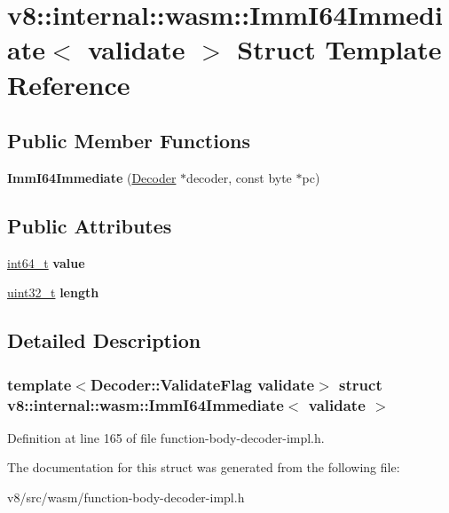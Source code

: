 \hypertarget{structv8_1_1internal_1_1wasm_1_1ImmI64Immediate}{}\section{v8\+:\+:internal\+:\+:wasm\+:\+:Imm\+I64\+Immediate$<$ validate $>$ Struct Template Reference}
\label{structv8_1_1internal_1_1wasm_1_1ImmI64Immediate}
\subsection*{Public Member Functions}
\begin{DoxyCompactItemize}
\item 
\mbox{\label{structv8_1_1internal_1_1wasm_1_1ImmI64Immediate_ab0d63add96e37537a83c05218728ee05}} 
{\bfseries Imm\+I64\+Immediate} (\mbox{\hyperlink{classv8_1_1internal_1_1wasm_1_1Decoder}{Decoder}} $\ast$decoder, const byte $\ast$pc)
\end{DoxyCompactItemize}
\subsection*{Public Attributes}
\begin{DoxyCompactItemize}
\item 
\mbox{\label{structv8_1_1internal_1_1wasm_1_1ImmI64Immediate_a79200de78ad91894418025eb49634295}} 
\mbox{\hyperlink{classint64__t}{int64\+\_\+t}} {\bfseries value}
\item 
\mbox{\label{structv8_1_1internal_1_1wasm_1_1ImmI64Immediate_a0bdfe4427e727a6afb91b50a582ca638}} 
\mbox{\hyperlink{classuint32__t}{uint32\+\_\+t}} {\bfseries length}
\end{DoxyCompactItemize}


\subsection{Detailed Description}
\subsubsection*{template$<$Decoder\+::\+Validate\+Flag validate$>$\newline
struct v8\+::internal\+::wasm\+::\+Imm\+I64\+Immediate$<$ validate $>$}



Definition at line 165 of file function-\/body-\/decoder-\/impl.\+h.



The documentation for this struct was generated from the following file\+:\begin{DoxyCompactItemize}
\item 
v8/src/wasm/function-\/body-\/decoder-\/impl.\+h\end{DoxyCompactItemize}
